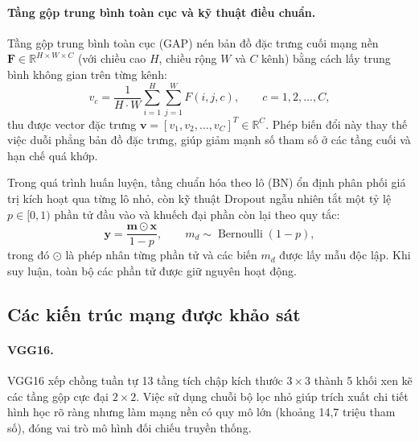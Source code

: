 \paragraph{Tầng gộp trung bình toàn cục và kỹ thuật điều chuẩn.}
Tầng gộp trung bình toàn cục (GAP) nén bản đồ đặc trưng cuối mạng nền $\mathbf{F} \in \mathbb{R}^{H \times W \times C}$ (với chiều cao $H$, chiều rộng $W$ và $C$ kênh) bằng cách lấy trung bình không gian trên từng kênh:
\begin{equation}
    v_c = \frac{1}{H \cdot W} \sum_{i=1}^{H} \sum_{j=1}^{W} F(i, j, c), \qquad c = 1, 2, \dots, C,
    \label{eq:gap}
\end{equation}
thu được vector đặc trưng $\mathbf{v} = [v_1, v_2, \dots, v_C]^T \in \mathbb{R}^C$. Phép biến đổi này thay thế việc duỗi phẳng bản đồ đặc trưng, giúp giảm mạnh số tham số ở các tầng cuối và hạn chế quá khớp.

Trong quá trình huấn luyện, tầng chuẩn hóa theo lô (BN) ổn định phân phối giá trị kích hoạt qua từng lô nhỏ, còn kỹ thuật Dropout ngẫu nhiên tắt một tỷ lệ $p \in [0, 1)$ phần tử đầu vào và khuếch đại phần còn lại theo quy tắc:
\begin{equation}
    \mathbf{y} = \frac{\mathbf{m} \odot \mathbf{x}}{1 - p}, \qquad m_d \sim \operatorname{Bernoulli}(1 - p),
    \label{eq:dropout}
\end{equation}
trong đó $\odot$ là phép nhân từng phần tử và các biến $m_d$ được lấy mẫu độc lập. Khi suy luận, toàn bộ các phần tử được giữ nguyên hoạt động.

\subsection{Các kiến trúc mạng được khảo sát}
\label{subsec:tested-architectures}

\paragraph{VGG16.}
VGG16 \cite{simonyan2014very} xếp chồng tuần tự 13 tầng tích chập kích thước $3\times 3$ thành 5 khối xen kẽ các tầng gộp cực đại $2\times 2$. Việc sử dụng chuỗi bộ lọc nhỏ giúp trích xuất chi tiết hình học rõ ràng nhưng làm mạng nền có quy mô lớn (khoảng 14,7 triệu tham số), đóng vai trò mô hình đối chiếu truyền thống.

